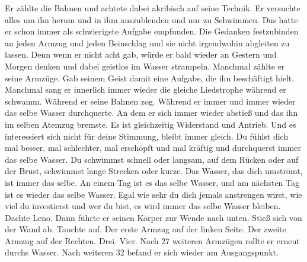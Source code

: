\documentclass[ngerman,smalldemyvopaper,11pt,oneside,onecolumn,openright,extrafontsizes]{memoir}
\begin{document}
Er zählte die Bahnen und achtete dabei akribisch auf seine Technik. Er versuchte alles um ihn herum und in ihm auszublenden und nur zu Schwimmen. Das hatte er schon immer als schwierigste Aufgabe empfunden. Die Gedanken festzubinden an jeden Armzug und jeden Beinschlag und sie nicht irgendwohin abgleiten zu lassen. Denn wenn er nicht acht gab, würde er bald wieder an Gestern und Morgen denken und dabei geistlos im Wasser strampeln. Manchmal zählte er seine Armzüge. Gab seinem Geist damit eine Aufgabe, die ihn beschäftigt hielt. Manchmal sang er innerlich immer wieder die gleiche Liedstrophe während er schwamm. Während er seine Bahnen zog. Während er immer und immer wieder das selbe Wasser durchquerte. An dem er sich immer wieder abstieß und das ihn im selben Atemzug bremste. Es ist gleichzeitig Widerstand und Antrieb. Und es interessiert sich nicht für deine Stimmung, bleibt immer gleich. Du fühlst dich mal besser, mal schlechter, mal erschöpft und mal kräftig und durchquerst immer das selbe Wasser. Du schwimmst schnell oder langsam, auf dem Rücken oder auf der Brust, schwimmst lange Strecken oder kurze. Das Wasser, das dich umströmt, ist immer das selbe. An einem Tag ist es das selbe Wasser, und am nächsten Tag ist es wieder das selbe Wasser. Egal wie sehr du dich jemals anstrengen wirst, wie viel du investierst und wer du bist, es wird immer das selbe Wasser bleiben. Dachte Leno. Dann führte er seinen Körper zur Wende nach unten. Stieß sich von der Wand ab. Tauchte auf. Der erste Armzug auf der linken Seite. Der zweite Armzug auf der Rechten. Drei. Vier. Nach 27 weiteren Armzügen rollte er erneut durchs Wasser. Nach weiteren 32 befand er sich wieder am Ausgangspunkt.
\end{document}
